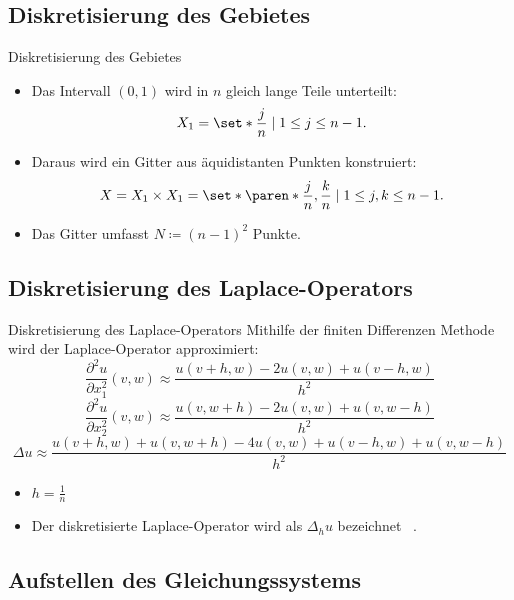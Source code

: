 \documentclass[9pt, t]{beamer}
\begin{document}
\subsection{Diskretisierung des Gebietes}

\begin{frame}{Diskretisierung des Gebietes}
    \begin{itemize}[<+->]
        \item Das Intervall \((0,1)\) wird in \(n\) gleich lange Teile
              unterteilt:
              \[
                  X_1 = \set*{ \frac{j}{n} \mid 1 \leq j \leq n-1}.
              \]
        \item Daraus wird ein Gitter aus äquidistanten Punkten konstruiert:
              \[
                  X
                  = X_1 \times X_1
                  = \set*{\paren*{\frac{j}{n}, \frac{k}{n}} \mid 1 \leq j, k \leq n-1}.
              \]
        \item Das Gitter umfasst \(N \coloneq {(n - 1)}^2\) Punkte.
    \end{itemize}
\end{frame}

\subsection{Diskretisierung des Laplace-Operators}

\begin{frame}{Diskretisierung des Laplace-Operators}
    Mithilfe der finiten Differenzen Methode wird der Laplace-Operator approximiert:
    \pause%
    \[
        \frac{\partial^2 u}{\partial x_1^2} (v, w)
        \approx \frac{u(v + h, w) - 2u(v, w) + u(v - h, w)}{h^2}
    \]
    \[
        \frac{\partial^2 u}{\partial x_2^2} (v, w)
        \approx \frac{u(v, w + h) - 2u(v, w) + u(v, w - h)}{h^2}
    \]
    \pause%
    \[
        \Delta u
        \approx \frac{u(v + h, w) + u(v, w + h)
            - 4u(v, w) + u(v - h, w) + u(v, w - h)}{h^2}
    \]
    \pause%
    \begin{itemize}[<+->]
        \item \(h = \frac{1}{n}\)
        \item Der diskretisierte Laplace-Operator wird als \(\Delta_h u\)
              bezeichnet \ \cite{PPI_Poisson}.
    \end{itemize}
\end{frame}

\subsection{Aufstellen des Gleichungssystems}
\end{document}
